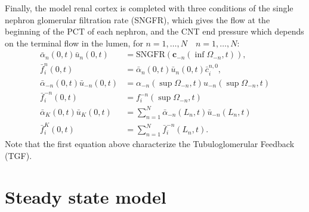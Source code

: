 \documentclass{article}
\begin{document}
Finally, the model renal cortex is completed with three conditions of the single nephron glomerular filtration rate (SNGFR), which gives the flow at the beginning of the PCT of each nephron, and the CNT end pressure which depends on the terminal flow in the lumen, for $n=1,\dots,N
\quad n=1,\dots,N$:
\begin{align}
    \bar{\alpha}_n (0,t)\bar{u}_n(0,t) &= \mathrm{SNGFR}\left( \mathbf{c}_{-n}\left( \inf \Omega_{-n},t \right) \right),\\
    \bar{f}_i^n (0,t) &= \bar{\alpha}_n (0,t)\bar{u}_n(0,t)\bar{c}_i^{n,0},\\
    \bar{\alpha}_{-n} (0,t)\bar{u}_{-n}(0,t) &= \alpha_{-n}(\sup \Omega_{-n},t)u_{-n}(\sup\Omega_{-n},t)\\
    \bar{f}_i^{-n} (0,t) &= f_{i}^{-n}(\sup\Omega_{-n},t)\\
    \bar{\alpha}_{K} (0,t)\bar{u}_{K}(0,t) &= \sum_{n=1}^N\bar{\alpha}_{-n}(L_n,t)\bar{u}_{-n}(L_n,t)\\
    \bar{f}_i^{K} (0,t) &= \sum_{n=1}^N \bar{f}_{i}^{-n}(L_n,t).
\end{align}
Note that the first equation above characterize the Tubuloglomerular Feedback (TGF).

\section{Steady state model}
\end{document}

